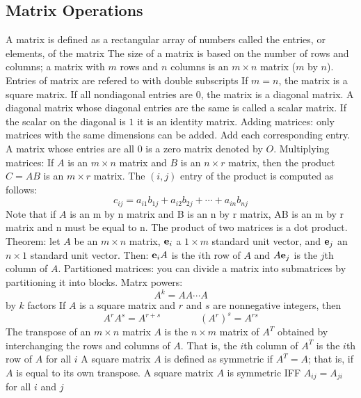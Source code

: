 \documentclass{article}
\begin{document}
        \subsection{Matrix Operations} %
        \begin{outline}
            \1 A matrix is defined as a rectangular array of numbers called the entries, or elements, of the matrix 
            \1 The size of a matrix is based on the number of rows and columns; a matrix with $m$ rows and $n$ columns is an $m \times n$ matrix ($m$ by $n$). 
            \1 Entries of matrix are refered to with double subscripts
            \1 If $m=n$, the matrix is a square matrix. If all nondiagonal entries are $0$, the matrix is a diagonal matrix. A diagonal matrix whose diagonal entries are the same is called a scalar matrix. If the scalar on the diagonal is $1$ it is an identity matrix. 
            \1 Adding matrices: only matrices with the same dimensions can be added. Add each corresponding entry. 
            \1 A matrix whose entries are all 0 is a zero matrix denoted by $O$. 
            \1 Multiplying matrices: If $A$ is an \(m\times n\) matrix and $B$ is an \(n\times r\) matrix, then the product \(C=AB\) is an \(m\times r\) matrix. The \((i,j)\) entry of the product is computed as follows: \[c_{ij}=a_{i1}b_{1j}+a_{i2}b_{2j}+\cdots+a_{in}b_{nj}\]
            \1 Note that if $A$ is an m by n matrix and B is an n by r matrix, AB is an m by r matrix and n must be equal to n. 
            \1 The product of two matrices is a dot product. 
            \1 Theorem: let $A$ be an \(m\times n\) matrix, \(\vb e_i\) a \(1\times m\) standard unit vector, and \(\vb e_j\) an \(n\times 1\) standard unit vector. Then:
                \2 \(\vb e_iA\) is the \(i\)th row of $A$ and 
                \2 \(A\vb e_j\) is the \(j\)th column of $A$. 
            \1 Partitioned matrices: you can divide a matrix into submatrices by partitioning it into blocks. 
            \1 Matrx powers: \[A^k=AA\cdots A\] by $k$ factors
            \1 If $A$ is a square matrix and $r$ and $s$ are nonnegative integers, then \[A^rA^s=A^{r+s}\qquad\qquad(A^r)^s=A^{rs}\]
            \1 The transpose of an \(m\times n\) matrix $A$ is the \(n\times m\) matrix of \(A^T\) obtained by interchanging the rows and columns of $A$. That is, the \(i\)th column of \(A^T\) is the \(i\)th row of $A$ for all $i$
            \1 A square matrix $A$ is defined as symmetric if \(A^T=A\); that is, if $A$ is equal to its own transpose. 
            \1 A square matrix $A$ is symmetric IFF \(A_{ij}=A_{ji}\) for all $i$ and $j$

       \end{outline}
\end{document}

